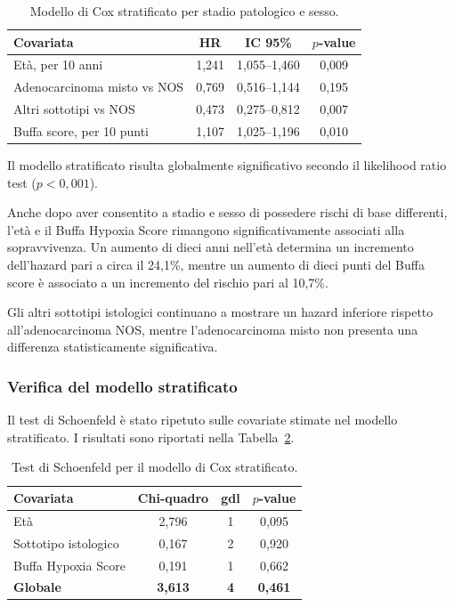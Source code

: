 \documentclass[12pt,a4paper]{article}
\begin{document}
\begin{table}[H]
\centering
\caption{Modello di Cox stratificato per stadio patologico e sesso.}
\label{tab:cox_stratificato}
\renewcommand{\arraystretch}{1.15}
\small
\begin{tabular}{l c c c}
\toprule
\textbf{Covariata}
& \textbf{HR}
& \textbf{IC 95\%}
& \textbf{$p$-value} \\
\midrule
Età, per 10 anni
& 1,241
& 1,055--1,460
& 0,009 \\

Adenocarcinoma misto vs NOS
& 0,769
& 0,516--1,144
& 0,195 \\

Altri sottotipi vs NOS
& 0,473
& 0,275--0,812
& 0,007 \\

Buffa score, per 10 punti
& 1,107
& 1,025--1,196
& 0,010 \\
\bottomrule
\end{tabular}
\end{table}

Il modello stratificato risulta globalmente significativo secondo il likelihood ratio test ($p<0,001$).

Anche dopo aver consentito a stadio e sesso di possedere rischi di base differenti, l'età e il Buffa Hypoxia Score rimangono significativamente associati alla sopravvivenza. Un aumento di dieci anni nell'età determina un incremento dell'hazard pari a circa il 24,1\%, mentre un aumento di dieci punti del Buffa score è associato a un incremento del rischio pari al 10,7\%.

Gli altri sottotipi istologici continuano a mostrare un hazard inferiore rispetto all'adenocarcinoma NOS, mentre l'adenocarcinoma misto non presenta una differenza statisticamente significativa.

\subsubsection{Verifica del modello stratificato}

Il test di Schoenfeld è stato ripetuto sulle covariate stimate nel modello stratificato. I risultati sono riportati nella Tabella~\ref{tab:schoenfeld_stratificato}.

\begin{table}[H]
\centering
\caption{Test di Schoenfeld per il modello di Cox stratificato.}
\label{tab:schoenfeld_stratificato}
\renewcommand{\arraystretch}{1.15}
\begin{tabular}{l c c c}
\toprule
\textbf{Covariata}
& \textbf{Chi-quadro}
& \textbf{gdl}
& \textbf{$p$-value} \\
\midrule
Età
& 2,796
& 1
& 0,095 \\

Sottotipo istologico
& 0,167
& 2
& 0,920 \\

Buffa Hypoxia Score
& 0,191
& 1
& 0,662 \\

\textbf{Globale}
& \textbf{3,613}
& \textbf{4}
& \textbf{0,461} \\
\bottomrule
\end{tabular}
\end{table}
\end{document}
